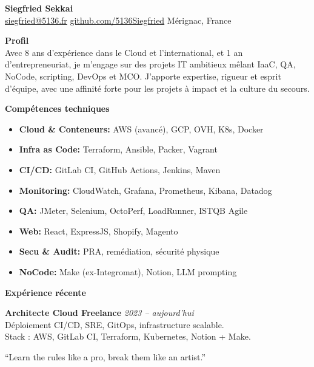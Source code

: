 \documentclass[a4paper,10pt]{article}
\begin{document}
\begin{center}
    {\LARGE \textbf{Siegfried Sekkai}}\\
    \vspace{2mm}
    \href{mailto:siegfried@5136.fr}{siegfried@5136.fr} \textbullet{}
    \href{https://github.com/5136Siegfried}{github.com/5136Siegfried} \textbullet{}
    Mérignac, France
\end{center}

\vspace{6mm}

\textbf{\textcolor{main}{Profil}}\\
Avec 8 ans d’expérience dans le Cloud et l’international, et 1 an d’entrepreneuriat, je m’engage sur des projets IT ambitieux mêlant IaaC, QA, NoCode, scripting, DevOps et MCO. J’apporte expertise, rigueur et esprit d’équipe, avec une affinité forte pour les projets à impact et la culture du secours.

\vspace{5mm}
\textbf{\textcolor{main}{Compétences techniques}}

\begin{multicols}{2}
\begin{itemize}[leftmargin=*, label={}]
    \item \textbf{Cloud \& Conteneurs:} AWS (avancé), GCP, OVH, K8s, Docker
    \item \textbf{Infra as Code:} Terraform, Ansible, Packer, Vagrant
    \item \textbf{CI/CD:} GitLab CI, GitHub Actions, Jenkins, Maven
    \item \textbf{Monitoring:} CloudWatch, Grafana, Prometheus, Kibana, Datadog
    \item \textbf{QA:} JMeter, Selenium, OctoPerf, LoadRunner, ISTQB Agile
    \item \textbf{Web:} React, ExpressJS, Shopify, Magento
    \item \textbf{Secu \& Audit:} PRA, remédiation, sécurité physique
    \item \textbf{NoCode:} Make (ex-Integromat), Notion, LLM prompting
\end{itemize}
\end{multicols}

\vspace{3mm}
\textbf{\textcolor{main}{Expérience récente}}

\textbf{Architecte Cloud Freelance} \hfill \textit{2023 – aujourd’hui}\\
Déploiement CI/CD, SRE, GitOps, infrastructure scalable. \\
Stack : AWS, GitLab CI, Terraform, Kubernetes, Notion + Make.

\vfill

\textcolor{accent}{\small “Learn the rules like a pro, break them like an artist.”}
\end{document}
